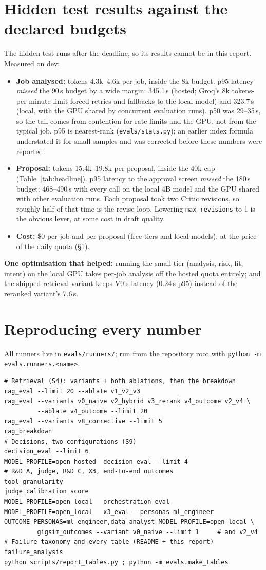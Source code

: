 \documentclass[10pt,a4paper]{article}
\newcommand{\code}[1]{\texttt{\small #1}}
\begin{document}
\section{Hidden test results against the declared budgets}

The hidden test runs after the deadline, so its results cannot be in this report. Measured on dev:
\begin{itemize}
\item \textbf{Job analysed:} tokens 4.3k--4.6k per job, inside the 8k budget. p95 latency \emph{missed} the 90\,s budget by a wide margin: 345.1\,s (hosted; Groq's 8k tokens-per-minute limit forced retries and fallbacks to the local model) and 323.7\,s (local, with the GPU shared by concurrent evaluation runs). p50 was 29--35\,s, so the tail comes from contention for rate limits and the GPU, not from the typical job. p95 is nearest-rank (\code{evals/stats.py}); an earlier index formula understated it for small samples and was corrected before these numbers were reported.
\item \textbf{Proposal:} tokens 15.4k--19.8k per proposal, inside the 40k cap (Table~\ref{tab:headline}). p95 latency to the approval screen \emph{missed} the 180\,s budget: 468--490\,s with every call on the local 4B model and the GPU shared with other evaluation runs. Each proposal took two Critic revisions, so roughly half of that time is the revise loop. Lowering \code{max\_revisions} to 1 is the obvious lever, at some cost in draft quality.
\item \textbf{Cost:} \$0 per job and per proposal (free tiers and local models), at the price of the daily quota (\S1).
\end{itemize}
\textbf{One optimisation that helped:} running the small tier (analysis, risk, fit, intent) on the local GPU takes per-job analysis off the hosted quota entirely; and the shipped retrieval variant keeps V0's latency (0.24\,s p95) instead of the reranked variant's 7.6\,s.

\appendix
\section{Reproducing every number}
All runners live in \code{evals/runners/}; run from the repository root with \code{python -m evals.runners.<name>}.
{\small\begin{verbatim}
# Retrieval (S4): variants + both ablations, then the breakdown
rag_eval --limit 20 --ablate v1_v2_v3
rag_eval --variants v0_naive v2_hybrid v3_rerank v4_outcome v2_v4 \
         --ablate v4_outcome --limit 20
rag_eval --variants v8_corrective --limit 5
rag_breakdown
# Decisions, two configurations (S9)
decision_eval --limit 6
MODEL_PROFILE=open_hosted  decision_eval --limit 4
# R&D A, judge, R&D C, X3, end-to-end outcomes
tool_granularity
judge_calibration score
MODEL_PROFILE=open_local   orchestration_eval
MODEL_PROFILE=open_local   x3_eval --personas ml_engineer
OUTCOME_PERSONAS=ml_engineer,data_analyst MODEL_PROFILE=open_local \
         gigsim_outcomes --variant v0_naive --limit 1     # and v2_v4
# Failure taxonomy and every table (README + this report)
failure_analysis
python scripts/report_tables.py ; python -m evals.make_tables
\end{verbatim}}
\end{document}

